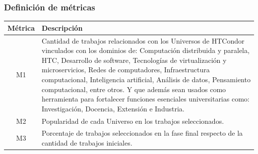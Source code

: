\subsubsection{Definición de métricas}
\begin{table}[H]
	\centering
	\renewcommand{\arraystretch}{1.2} %
	\footnotesize %
	\begin{tabular}{|c|p{13cm}|} %
		\hline
		\textbf{Métrica} & \textbf{Descripción}                                                                                                                                                                                                                                                                                                                                                                                                                                                                                           \\ \hline
		M1               & Cantidad de trabajos relacionados con los Universos de HTCondor vinculados con los dominios de: Computación distribuida y paralela, HTC, Desarrollo de software, Tecnologías de virtualización y microservicios, Redes de computadores, Infraestructura computacional, Inteligencia artificial, Análisis de datos, Pensamiento computacional, entre otros. Y que además sean usados como herramienta para fortalecer funciones esenciales universitarias como: Investigación, Docencia, Extensión e Industria. \\ \hline
		M2               & Popularidad de cada Universo en los trabajos seleccionados.                                                                                                                                                                                                                                                                                                                                                                                                                                                    \\ \hline
		M3               & Porcentaje de trabajos seleccionados en la fase final respecto de la cantidad de trabajos iniciales.                                                                                                                                                                                                                                                                                                                                                                                                           \\ \hline

\end{tabular}
\end{table}

